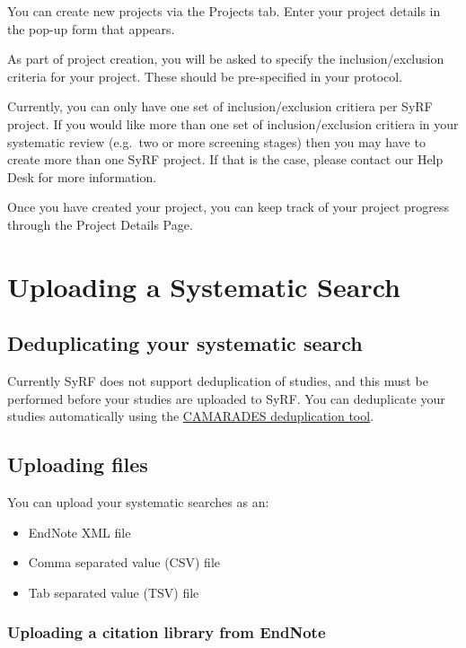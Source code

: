 \documentclass[
]{book}
\providecommand{\tightlist}{%
  \setlength{\itemsep}{0pt}\setlength{\parskip}{0pt}}
\begin{document}
You can create new projects via the Projects tab. Enter your project details in the pop-up form that appears.

As part of project creation, you will be asked to specify the inclusion/exclusion criteria for your project. These should be pre-specified in your protocol.

Currently, you can only have one set of inclusion/exclusion critiera per SyRF project. If you would like more than one set of inclusion/exclusion critiera in your systematic review (e.g.~two or more screening stages) then you may have to create more than one SyRF project. If that is the case, please contact our Help Desk for more information.

Once you have created your project, you can keep track of your project progress through the Project Details Page.

\hypertarget{systematicSearch}{%
\chapter{Uploading a Systematic Search}\label{systematicSearch}}

\hypertarget{deduplicating-your-systematic-search}{%
\section{Deduplicating your systematic search}\label{deduplicating-your-systematic-search}}

Currently SyRF does not support deduplication of studies, and this must be performed before your studies are uploaded to SyRF. You can deduplicate your studies automatically using the \href{https://camarades.shinyapps.io/RDedup/}{CAMARADES deduplication tool}.

\hypertarget{uploading-files}{%
\section{Uploading files}\label{uploading-files}}

You can upload your systematic searches as an:

\begin{itemize}
\tightlist
\item
  EndNote XML file
\item
  Comma separated value (CSV) file
\item
  Tab separated value (TSV) file
\end{itemize}

\hypertarget{uploading-a-citation-library-from-endnote}{%
\subsection{Uploading a citation library from EndNote}\label{uploading-a-citation-library-from-endnote}}
\end{document}
